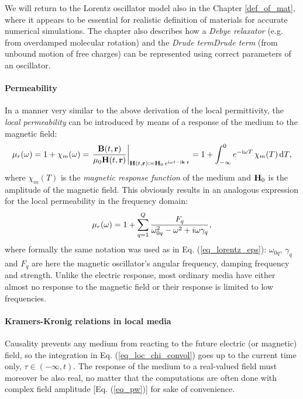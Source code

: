 We will return to the Lorentz oscillator model also in the Chapter \ref{def_of_mat}, where it appears to be essential for realistic definition of materials for accurate numerical simulations. The chapter also describes how a \textit{Debye relaxator} (e.g. from overdamped molecular rotation) and the \textit{Drude term}\textit{Drude term} (from unbound motion of free charges) can be represented using correct parameters of an oscillator.
\paragraph{Permeability}  %
In a manner very similar to the above derivation of the local permittivity, the \textit{local permeability} can be introduced by means of a response of the medium to the magnetic field:
\begin{equation} \mu_r(\omega) = 1 + \chi_m(\omega) = \left.\frac{\mathbf{B}(t,{\mathbf{r}})}{\mu_0\mathbf{H}(t,{\mathbf{r}})} \right|_{\mathbf{H}(t, {\mathbf{r}}) := \mathbf{H}_0 \, e^{{\mathrm i}\omega t - {\mathrm i}{\mathbf{k}}\cdot{\mathbf{r}}}} = 1 + \int_{-\infty}^{0} e^{-{\mathrm i}\omega T} \,\chi_m(T) \,\mbox{d}T, \label{eq_mu_loc}\end{equation}
where $\chi_m(T)$ is the \textit{magnetic response function} of the medium and $\mathbf{H}_0$ is the amplitude of the magnetic field. This obviously results in an analogous expression for the local permeability in the frequency domain:
\begin{equation} \mu_r(\omega) = 1 + \sum_{q=1}^Q \frac{F_q}{\omega_{0q}^2 - \omega^2 + i\omega\gamma_q}, \label{eq_lorentz_mu}\end{equation} 
where formally the same notation was used as in  Eq. (\ref{eq_lorentz_eps}): $\omega_{0q}$, $\gamma_q$ and $F_q$ are here the magnetic oscillator's angular frequency, damping frequency and strength. Unlike the electric response, most ordinary media have either almost no response to the magnetic field or their response is limited to low frequencies.

\paragraph{Kramers-Kronig relations in local media}%
Causality prevents any medium from reacting to the future electric (or magnetic) field, so the integration in Eq. (\ref{eq_loc_chi_convol}) goes up to the current time only, $\tau \in (-\infty, t)$. The response of the medium to a real-valued field must moreover be also real, no matter that the computations are often done with complex field amplitude [Eq. (\ref{eq_pw})] for sake of convenience. 

